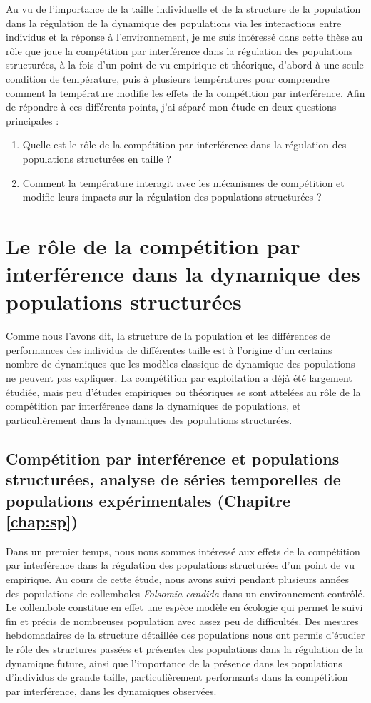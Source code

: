 Au vu de l'importance de la taille individuelle et de la structure de la
population dans la régulation de la dynamique des populations via les
interactions entre individus et la réponse à l'environnement, je me suis
intéressé dans cette thèse au rôle que joue la compétition par interférence dans
la régulation des populations structurées, à la fois d'un point de vu empirique
et théorique, d'abord à une seule condition de température, puis à plusieurs
températures pour comprendre comment la température modifie les effets de la
compétition par interférence. Afin de répondre à ces différents points, j'ai
séparé mon étude en deux questions principales :
\begin{enumerate}
  \item Quelle est le rôle de la compétition par interférence dans la régulation
  des populations structurées en taille ?
  \item Comment la température interagit avec les mécanismes de compétition et
  modifie leurs impacts sur la régulation des populations structurées ?
\end{enumerate}

\section{Le rôle de la compétition par interférence dans la dynamique des
populations structurées}

Comme nous l'avons dit, la structure de la population et les différences de
performances des individus de différentes taille est à l'origine d'un certains
nombre de dynamiques que les modèles classique de dynamique des populations ne
peuvent pas expliquer. La compétition par exploitation a déjà été largement
étudiée, mais peu d'études empiriques ou théoriques se sont attelées au rôle de
la compétition par interférence dans la dynamiques de populations, et
particulièrement dans la dynamiques des populations structurées.

\subsection{Compétition par interférence et populations structurées,
analyse de séries temporelles de populations expérimentales (Chapitre \ref{chap:sp})}

Dans un premier temps, nous nous sommes intéressé aux effets de la compétition
par interférence dans la régulation des populations structurées d'un point de vu
empirique. Au cours de cette étude, nous avons suivi pendant plusieurs années
des populations de collemboles \textit{Folsomia candida} dans un environnement
contrôlé. Le collembole constitue en effet une espèce modèle en écologie
\autocites{fountain2005a} qui permet le suivi fin et précis de nombreuses
population avec assez peu de difficultés. Des mesures hebdomadaires de la
structure détaillée des populations nous ont permis d'étudier le rôle des
structures passées et présentes des populations dans la régulation de la
dynamique future, ainsi que l'importance de la présence dans les populations
d'individus de grande taille, particulièrement performants dans la compétition par interférence, dans les
dynamiques observées. 

